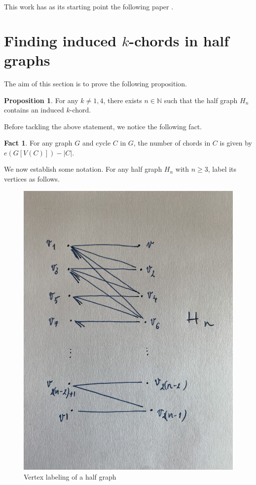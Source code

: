 \documentclass[12pt]{article}
\theoremstyle{definition}
\newtheorem{prop}[thm]{Proposition}
\newtheorem{fact}[thm]{Fact}
\begin{document}
    
    This work has as its starting
    point the following paper \cite{kchord_ori}.

    \section{Finding induced \texorpdfstring{$k$}{k}-chords in half graphs}
    
    The aim of this section 
    is to prove the following 
    proposition.

    \begin{prop} \label{prop:hg}
        For any $k \neq 1, 4$,
        there exists $n \in \mathbb{N}$
        such that the half
        graph $H_{n}$ 
        contains an induced 
        $k$-chord.
    \end{prop}

    Before tackling the
    above statement, we notice the
    following fact.
    
    \begin{fact} \label{fact:edges}
        For any graph $G$
        and cycle $C$ in $G$, 
        the number of chords in $C$ 
        is given by $e\left(G\left[V\left(C\right)\right]\right)
        - \left|C\right|$.
    \end{fact}
    
    We now establish 
    some notation. For
    any half graph $H_{n}$ 
    with $n \geq 3$, label
    its vertices as follows.
    \begin{figure}[ht]
        \centering
        \includegraphics[width=0.5\linewidth, angle=270]{figures/hgraph.jpg}
        \caption{Vertex labeling of a half graph}
        \label{fig:hg}
    \end{figure}
\end{document}
